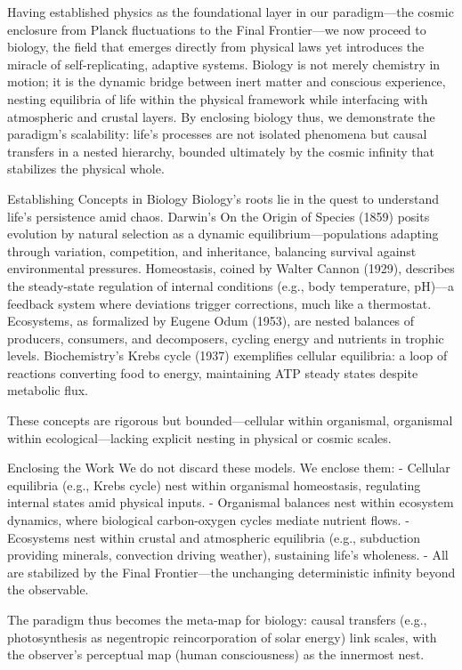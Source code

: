Having established physics as the foundational layer in our paradigm—the cosmic enclosure from Planck fluctuations to the Final Frontier—we now proceed to biology, the field that emerges directly from physical laws yet introduces the miracle of self-replicating, adaptive systems. Biology is not merely chemistry in motion; it is the dynamic bridge between inert matter and conscious experience, nesting equilibria of life within the physical framework while interfacing with atmospheric and crustal layers. By enclosing biology thus, we demonstrate the paradigm’s scalability: life’s processes are not isolated phenomena but causal transfers in a nested hierarchy, bounded ultimately by the cosmic infinity that stabilizes the physical whole.

Establishing Concepts in Biology  
Biology’s roots lie in the quest to understand life’s persistence amid chaos. Darwin’s On the Origin of Species (1859) posits evolution by natural selection as a dynamic equilibrium—populations adapting through variation, competition, and inheritance, balancing survival against environmental pressures. Homeostasis, coined by Walter Cannon (1929), describes the steady-state regulation of internal conditions (e.g., body temperature, pH)—a feedback system where deviations trigger corrections, much like a thermostat. Ecosystems, as formalized by Eugene Odum (1953), are nested balances of producers, consumers, and decomposers, cycling energy and nutrients in trophic levels. Biochemistry’s Krebs cycle (1937) exemplifies cellular equilibria: a loop of reactions converting food to energy, maintaining ATP steady states despite metabolic flux.

These concepts are rigorous but bounded—cellular within organismal, organismal within ecological—lacking explicit nesting in physical or cosmic scales.

Enclosing the Work  
We do not discard these models. We enclose them:  
- Cellular equilibria (e.g., Krebs cycle) nest within organismal homeostasis, regulating internal states amid physical inputs.  
- Organismal balances nest within ecosystem dynamics, where biological carbon-oxygen cycles mediate nutrient flows.  
- Ecosystems nest within crustal and atmospheric equilibria (e.g., subduction providing minerals, convection driving weather), sustaining life’s wholeness.  
- All are stabilized by the Final Frontier—the unchanging deterministic infinity beyond the observable.

The paradigm thus becomes the meta-map for biology: causal transfers (e.g., photosynthesis as negentropic reincorporation of solar energy) link scales, with the observer’s perceptual map (human consciousness) as the innermost nest.

